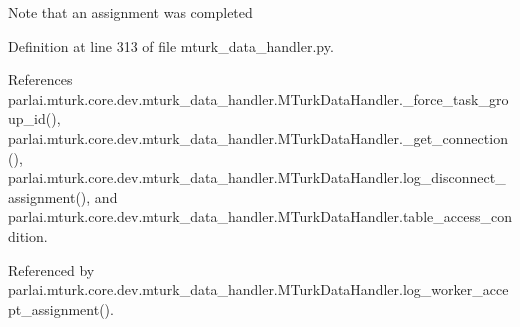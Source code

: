 \begin{DoxyVerb}Note that an assignment was completed\end{DoxyVerb}
 

Definition at line 313 of file mturk\+\_\+data\+\_\+handler.\+py.



References parlai.\+mturk.\+core.\+dev.\+mturk\+\_\+data\+\_\+handler.\+M\+Turk\+Data\+Handler.\+\_\+force\+\_\+task\+\_\+group\+\_\+id(), parlai.\+mturk.\+core.\+dev.\+mturk\+\_\+data\+\_\+handler.\+M\+Turk\+Data\+Handler.\+\_\+get\+\_\+connection(), parlai.\+mturk.\+core.\+dev.\+mturk\+\_\+data\+\_\+handler.\+M\+Turk\+Data\+Handler.\+log\+\_\+disconnect\+\_\+assignment(), and parlai.\+mturk.\+core.\+dev.\+mturk\+\_\+data\+\_\+handler.\+M\+Turk\+Data\+Handler.\+table\+\_\+access\+\_\+condition.



Referenced by parlai.\+mturk.\+core.\+dev.\+mturk\+\_\+data\+\_\+handler.\+M\+Turk\+Data\+Handler.\+log\+\_\+worker\+\_\+accept\+\_\+assignment().

